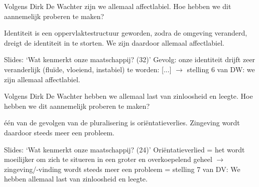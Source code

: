 \documentclass[main.tex]{subfiles}
\begin{document}
\begin{examenvraag}
    \begin{vraag}
        Volgens Dirk De Wachter zijn we allemaal affectlabiel. Hoe hebben we dit aannemelijk proberen te maken?
    \end{vraag}

    \begin{antwoord}
        Identiteit is een oppervlaktestructuur geworden, zodra de omgeving veranderd, dreigt de identiteit in te storten.
        We zijn daardoor allemaal affectlabiel.
        \begin{citaat}{Slides: `Wat kenmerkt onze maatschappij? (32)'}
            Gevolg: onze identiteit drijft zeer veranderlijk (flu\"ide, vloeiend, instabiel) te worden:
            [...]
            $\rightarrow$ stelling 6 van DW: we zijn allemaal affectlabiel.
        \end{citaat}
    \end{antwoord}
\end{examenvraag}


\begin{examenvraag}
    \begin{vraag}
        Volgens Dirk De Wachter hebben we allemaal last van zinloosheid en leegte. Hoe hebben we dit aannemelijk proberen te maken?
    \end{vraag}

    \begin{antwoord}
        \'e\'en van de gevolgen van de pluralisering is ori\"entatieverlies.
        Zingeving wordt daardoor steeds meer een probleem.
        \begin{citaat}{Slides: `Wat kenmerkt onze maatschappij? (24)'}
            Ori\"entatieverlied = het wordt moeilijker om zich te situeren in een groter en overkoepelend geheel $\rightarrow$ zingeving/-vinding wordt steeds meer een probleem = stelling 7 van DV: We hebben allemaal last van zinloosheid en leegte.
        \end{citaat}
    \end{antwoord}
\end{examenvraag}
\end{document}
